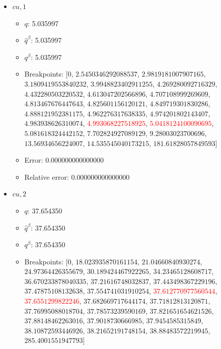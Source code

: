 \documentclass{article}%
\begin{document}
\begin{itemize}
\begin{itemize}
		\item $q$: 143.302750%
		\item $\hat{q}^\beta$: 143.302750%
		\item $q^\beta$: 143.302750%
		\item Breakpoints: $[$$0$, $9.898970403313276$, $28.333333333333332$, $42.69900440382105$, $48.67452649027746$, $79.83702775273511$, $87.16107999267206$, $118.88765652962957$, $128.52021081477858$, $131.69760457629607$, $132.12228195956155$, $135.81963163113545$, $137.02923097052596$, $138.86359281280824$, $139.47623233772285$, $140.31685261310218$, $140.7008934199032$, $141.79783607898793$, \textcolor{red}{$142.4338700260237$}, \textcolor{red}{$144.67005099128556$}, $144.70843093515643$, $147.07009017600456$, $147.48374761404892$, $149.84689443310864$, $720.0$$]$%
		\item Error: 0.000000000000000%
		\item Relative error: 0.000000000000000%
	\end{itemize}%
	\item $\textit{cu},1$%
	\begin{itemize}%
		\item $q$: 5.035997%
		\item $\hat{q}^\beta$: 5.035997%
		\item $q^\beta$: 5.035997%
		\item Breakpoints: $[$$0$, $2.5450346292088537$, $2.9819181007907165$, $3.1809419553840232$, $3.9948823402911255$, $4.269280092716329$, $4.432280503220532$, $4.613047202566896$, $4.707108999269609$, $4.813467676447643$, $4.825601156120121$, $4.849719301830286$, $4.888121952381175$, $4.962276317638335$, $4.974201802143407$, $4.983938626310074$, \textcolor{red}{$4.993068227518925$}, \textcolor{red}{$5.0418124100090695$}, $5.081618324442152$, $7.702824927089129$, $9.28003023700696$, $13.56934656224007$, $14.535545040173215$, $181.61828057849593$$]$%
		\item Error: 0.000000000000000%
		\item Relative error: 0.000000000000000%
	\end{itemize}%
	\item $\textit{cu},2$%
	\begin{itemize}%
		\item $q$: 37.654350%
		\item $\hat{q}^\beta$: 37.654350%
		\item $q^\beta$: 37.654350%
		\item Breakpoints: $[$$0$, $18.023935870161154$, $21.04660840930274$, $24.97364426355679$, $30.189424467922265$, $34.23465128608717$, $36.670233878040335$, $37.21616748032837$, $37.443498367229196$, $37.47875108132638$, $37.554741031910254$, \textcolor{red}{$37.612770977560544$}, \textcolor{red}{$37.6551299822246$}, $37.682669717644174$, $37.71812813120871$, $37.76995088018704$, $37.78573239590169$, $37.821651654621526$, $37.88148462263016$, $37.9018730666985$, $37.9454585315849$, $38.10872593446926$, $38.21652191748154$, $38.88483572219945$, $285.4001551947793$$]$%

\end{itemize}
\end{itemize}
\end{document}

